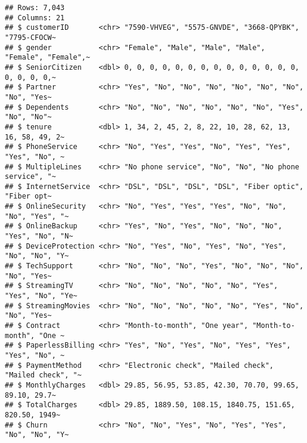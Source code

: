 \documentclass[
]{article}
\begin{document}
\begin{verbatim}
## Rows: 7,043
## Columns: 21
## $ customerID       <chr> "7590-VHVEG", "5575-GNVDE", "3668-QPYBK", "7795-CFOCW~
## $ gender           <chr> "Female", "Male", "Male", "Male", "Female", "Female",~
## $ SeniorCitizen    <dbl> 0, 0, 0, 0, 0, 0, 0, 0, 0, 0, 0, 0, 0, 0, 0, 0, 0, 0,~
## $ Partner          <chr> "Yes", "No", "No", "No", "No", "No", "No", "No", "Yes~
## $ Dependents       <chr> "No", "No", "No", "No", "No", "No", "Yes", "No", "No"~
## $ tenure           <dbl> 1, 34, 2, 45, 2, 8, 22, 10, 28, 62, 13, 16, 58, 49, 2~
## $ PhoneService     <chr> "No", "Yes", "Yes", "No", "Yes", "Yes", "Yes", "No", ~
## $ MultipleLines    <chr> "No phone service", "No", "No", "No phone service", "~
## $ InternetService  <chr> "DSL", "DSL", "DSL", "DSL", "Fiber optic", "Fiber opt~
## $ OnlineSecurity   <chr> "No", "Yes", "Yes", "Yes", "No", "No", "No", "Yes", "~
## $ OnlineBackup     <chr> "Yes", "No", "Yes", "No", "No", "No", "Yes", "No", "N~
## $ DeviceProtection <chr> "No", "Yes", "No", "Yes", "No", "Yes", "No", "No", "Y~
## $ TechSupport      <chr> "No", "No", "No", "Yes", "No", "No", "No", "No", "Yes~
## $ StreamingTV      <chr> "No", "No", "No", "No", "No", "Yes", "Yes", "No", "Ye~
## $ StreamingMovies  <chr> "No", "No", "No", "No", "No", "Yes", "No", "No", "Yes~
## $ Contract         <chr> "Month-to-month", "One year", "Month-to-month", "One ~
## $ PaperlessBilling <chr> "Yes", "No", "Yes", "No", "Yes", "Yes", "Yes", "No", ~
## $ PaymentMethod    <chr> "Electronic check", "Mailed check", "Mailed check", "~
## $ MonthlyCharges   <dbl> 29.85, 56.95, 53.85, 42.30, 70.70, 99.65, 89.10, 29.7~
## $ TotalCharges     <dbl> 29.85, 1889.50, 108.15, 1840.75, 151.65, 820.50, 1949~
## $ Churn            <chr> "No", "No", "Yes", "No", "Yes", "Yes", "No", "No", "Y~
\end{verbatim}
\end{document}
